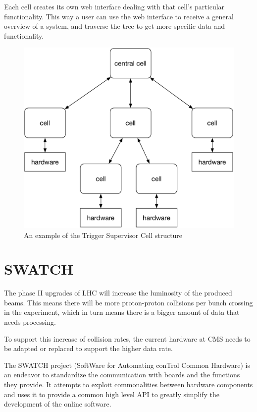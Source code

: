 Each cell creates its own web interface dealing with that cell's particular
functionality. This way a user can use the web interface to receive a general
overview of a system, and traverse the tree to get more specific data and
functionality.

\begin{figure}
  \centering
  \includegraphics[width=.75\textwidth]{images/cell-tree}
  \caption{An example of the Trigger Supervisor Cell structure}
  \label{fig:cell-tree}
\end{figure}

\section{SWATCH}
The phase II upgrades of LHC will increase the luminosity of the produced beams.
This means there will be more proton-proton collisions per bunch crossing in the
experiment, which in turn means there is a bigger amount of data that needs
processing.

To support this increase of collision rates, the current hardware at CMS needs
to be adapted or replaced to support the higher data rate.

The SWATCH project (SoftWare for Automating conTrol Common Hardware) is an
endeavor to standardize the communication with boards and the functions they
provide.
It attempts to exploit commonalities between hardware components and uses it
to provide a common high level API to greatly simplify the development of the
online software\cite{SWATCH}.
